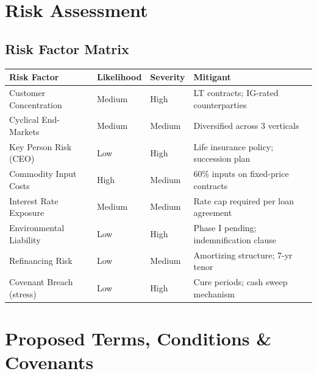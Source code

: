\documentclass[11pt,a4paper]{article}
\begin{document}
\par
\vspace{6mm}

\section{Risk Assessment}

\subsection{Risk Factor Matrix}

\renewcommand{\arraystretch}{1.35}
\begin{tabularx}{\textwidth}{@{} L{3.5cm} C{1.6cm} C{1.6cm} L{6.0cm} @{}}
  \toprule
  {\color{white}\bfseries Risk Factor} &
  {\color{white}\bfseries Likelihood} &
  {\color{white}\bfseries Severity} &
  {\color{white}\bfseries Mitigant} \\
  \midrule
  Customer Concentration    & Medium  & High   & LT contracts; IG-rated counterparties \\
  Cyclical End-Markets      & Medium  & Medium & Diversified across 3 verticals \\
  Key Person Risk (CEO)     & Low     & High   & Life insurance policy; succession plan \\
  Commodity Input Costs     & High    & Medium & 60\% inputs on fixed-price contracts \\
  Interest Rate Exposure    & Medium  & Medium & Rate cap required per loan agreement \\
  Environmental Liability   & Low     & High   & Phase I pending; indemnification clause \\
  Refinancing Risk          & Low     & Medium & Amortizing structure; 7-yr tenor \\
  Covenant Breach (stress)  & Low     & High   & Cure periods; cash sweep mechanism \\
  \bottomrule
\end{tabularx}

\vspace{6mm}

\section{Proposed Terms, Conditions \& Covenants}
\end{document}
